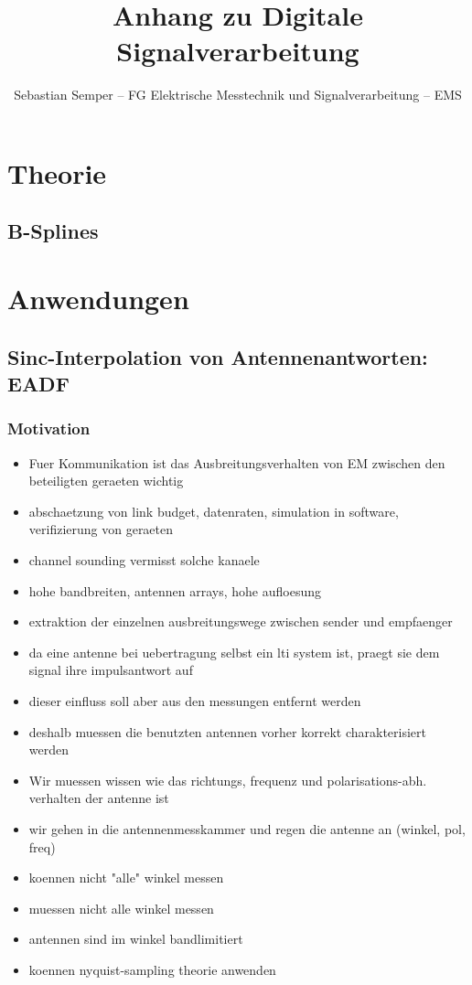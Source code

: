 

\title{Anhang zu Digitale Signalverarbeitung}
\author{Sebastian Semper -- FG Elektrische Messtechnik und Signalverarbeitung -- EMS}




\section{Theorie}
\subsection{B-Splines}
\section{Anwendungen}
\subsection{Sinc-Interpolation von Antennenantworten: EADF}
\subsubsection{Motivation}
\begin{itemize}
    \item Fuer Kommunikation ist das Ausbreitungsverhalten von EM zwischen den beteiligten geraeten wichtig
    \item abschaetzung von link budget, datenraten, simulation in software, verifizierung von geraeten
    \item channel sounding vermisst solche kanaele \cite{thomae2005multidim_hrpe}
    \item hohe bandbreiten, antennen arrays, hohe aufloesung
    \item extraktion der einzelnen ausbreitungswege zwischen sender und empfaenger
    \item da eine antenne bei uebertragung selbst ein \gls{lti} system ist, praegt sie dem signal ihre impulsantwort auf
    \item dieser einfluss soll aber aus den messungen entfernt werden
    \item deshalb muessen die benutzten antennen vorher korrekt charakterisiert werden
    \item Wir muessen wissen wie das richtungs, frequenz und polarisations-abh. verhalten der antenne ist
    \item wir gehen in die antennenmesskammer und regen die antenne an (winkel, pol, freq)
    \item koennen nicht "alle" winkel messen
    \item muessen nicht alle winkel messen \cite{delgaldo2007phd}
    \item antennen sind im winkel bandlimitiert
    \item koennen nyquist-sampling theorie anwenden
\end{itemize}
